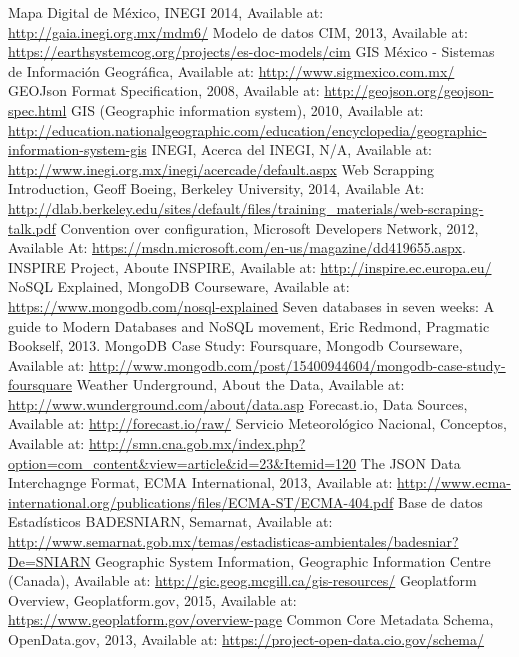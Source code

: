 \begin{thebibliography}{1}
		Mapa Digital de México, INEGI 2014, Available at: \url{http://gaia.inegi.org.mx/mdm6/}
	   Modelo de datos CIM, 2013, Available at: \url{https://earthsystemcog.org/projects/es-doc-models/cim}
		 GIS México - Sistemas de Información Geográfica, Available at: \url{http://www.sigmexico.com.mx/}
	     GEOJson Format Specification, 2008, Available at: \url{http://geojson.org/geojson-spec.html}
		 GIS (Geographic information system), 2010, Available at: \url{http://education.nationalgeographic.com/education/encyclopedia/geographic-information-system-gis}
		INEGI, Acerca del INEGI, N/A, Available at: \url{http://www.inegi.org.mx/inegi/acercade/default.aspx}
		Web Scrapping Introduction, Geoff Boeing, Berkeley University, 2014, Available At: \url{http://dlab.berkeley.edu/sites/default/files/training\_materials/web-scraping-talk.pdf}
		Convention over configuration, Microsoft Developers Network, 2012, Available At: \url{https://msdn.microsoft.com/en-us/magazine/dd419655.aspx}.
	    INSPIRE Project, Aboute INSPIRE, Available at: \url{http://inspire.ec.europa.eu/}
		NoSQL Explained, MongoDB Courseware, Available at: \url{https://www.mongodb.com/nosql-explained}
		Seven databases in seven weeks: A guide to Modern Databases and NoSQL movement, Eric Redmond, Pragmatic Bookself, 2013.
		MongoDB Case Study: Foursquare, Mongodb Courseware, Available at: \url{http://www.mongodb.com/post/15400944604/mongodb-case-study-foursquare}
		Weather Underground, About the Data, Available at: \url{http://www.wunderground.com/about/data.asp}
		Forecast.io, Data Sources, Available at: \url{http://forecast.io/raw/}
		Servicio Meteorológico Nacional, Conceptos, Available at: \url{http://smn.cna.gob.mx/index.php?option=com_content&view=article&id=23&Itemid=120}
    The JSON Data Interchagnge Format, ECMA International, 2013, Available at: \url{http://www.ecma-international.org/publications/files/ECMA-ST/ECMA-404.pdf}
    Base de datos Estadísticos BADESNIARN, Semarnat, Available at: \url{http://www.semarnat.gob.mx/temas/estadisticas-ambientales/badesniar?De=SNIARN}
    Geographic System Information, Geographic Information Centre (Canada), Available at: \url{http://gic.geog.mcgill.ca/gis-resources/}
    Geoplatform Overview, Geoplatform.gov, 2015, Available at:  \url{https://www.geoplatform.gov/overview-page}
    Common Core Metadata Schema, OpenData.gov, 2013, Available at: \url{https://project-open-data.cio.gov/schema/}
    
\end{thebibliography}

